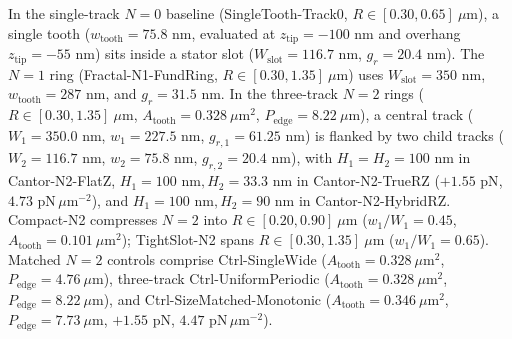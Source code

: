 \documentclass[11pt, a4paper]{article}
\begin{document}
In the single-track $N=0$ baseline (SingleTooth-Track0, $R \in [0.30, 0.65]\ \mu\text{m}$), a single tooth ($w_{\mathrm{tooth}} = 75.8\text{ nm}$, evaluated at $z_{\mathrm{tip}} = -100\text{ nm}$ and overhang $z_{\mathrm{tip}} = -55\text{ nm}$) sits inside a stator slot ($W_{\mathrm{slot}} = 116.7\text{ nm}$, $g_r = 20.4\text{ nm}$). The $N=1$ ring (Fractal-N1-FundRing, $R \in [0.30, 1.35]\ \mu\text{m}$) uses $W_{\mathrm{slot}} = 350\text{ nm}$, $w_{\mathrm{tooth}} = 287\text{ nm}$, and $g_r = 31.5\text{ nm}$. In the three-track $N=2$ rings ($R \in [0.30, 1.35]\ \mu\text{m}$, $A_{\mathrm{tooth}} = 0.328\ \mu\text{m}^2$, $P_{\mathrm{edge}} = 8.22\ \mu\text{m}$), a central track ($W_1 = 350.0\text{ nm}$, $w_1 = 227.5\text{ nm}$, $g_{r,1} = 61.25\text{ nm}$) is flanked by two child tracks ($W_2 = 116.7\text{ nm}$, $w_2 = 75.8\text{ nm}$, $g_{r,2} = 20.4\text{ nm}$), with $H_1 = H_2 = 100\text{ nm}$ in Cantor-N2-FlatZ, $H_1 = 100\text{ nm}, H_2 = 33.3\text{ nm}$ in Cantor-N2-TrueRZ ($+1.55\text{ pN}$, $4.73\text{ pN}\,\mu\text{m}^{-2}$), and $H_1 = 100\text{ nm}, H_2 = 90\text{ nm}$ in Cantor-N2-HybridRZ. Compact-N2 compresses $N=2$ into $R \in [0.20, 0.90]\ \mu\text{m}$ ($w_1/W_1 = 0.45$, $A_{\mathrm{tooth}} = 0.101\ \mu\text{m}^2$); TightSlot-N2 spans $R \in [0.30, 1.35]\ \mu\text{m}$ ($w_1/W_1 = 0.65$). Matched $N=2$ controls comprise Ctrl-SingleWide ($A_{\mathrm{tooth}} = 0.328\ \mu\text{m}^2$, $P_{\mathrm{edge}} = 4.76\ \mu\text{m}$), three-track Ctrl-UniformPeriodic ($A_{\mathrm{tooth}} = 0.328\ \mu\text{m}^2$, $P_{\mathrm{edge}} = 8.22\ \mu\text{m}$), and Ctrl-SizeMatched-Monotonic ($A_{\mathrm{tooth}} = 0.346\ \mu\text{m}^2$, $P_{\mathrm{edge}} = 7.73\ \mu\text{m}$, $+1.55\text{ pN}$, $4.47\text{ pN}\,\mu\text{m}^{-2}$).
\end{document}
